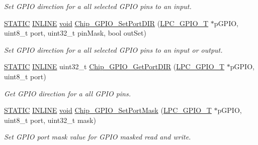 \begin{DoxyCompactItemize}
\begin{DoxyCompactList}\small\item\em Set G\-P\-I\-O direction for a all selected G\-P\-I\-O pins to an input. \end{DoxyCompactList}\item 
\hyperlink{group__LPC__Types__Public__Macros_ga10b2d890d871e1489bb02b7e70d9bdfb}{S\-T\-A\-T\-I\-C} \hyperlink{group__LPC__Types__Public__Types_ga2eb6f9e0395b47b8d5e3eeae4fe0c116}{I\-N\-L\-I\-N\-E} \hyperlink{Paradigm_2Tern__EE_2small_2portmacro_8h_a14d32f8130d3c0b212cfc751730b5b49}{void} \hyperlink{group__GPIO__17XX__40XX_ga6ceffe51a34be90a077b22657b1f90f0}{Chip\-\_\-\-G\-P\-I\-O\-\_\-\-Set\-Port\-D\-I\-R} (\hyperlink{structLPC__GPIO__T}{L\-P\-C\-\_\-\-G\-P\-I\-O\-\_\-\-T} $\ast$p\-G\-P\-I\-O, uint8\-\_\-t port, uint32\-\_\-t pin\-Mask, bool out\-Set)
\begin{DoxyCompactList}\small\item\em Set G\-P\-I\-O direction for a all selected G\-P\-I\-O pins to an input or output. \end{DoxyCompactList}\item 
\hyperlink{group__LPC__Types__Public__Macros_ga10b2d890d871e1489bb02b7e70d9bdfb}{S\-T\-A\-T\-I\-C} \hyperlink{group__LPC__Types__Public__Types_ga2eb6f9e0395b47b8d5e3eeae4fe0c116}{I\-N\-L\-I\-N\-E} uint32\-\_\-t \hyperlink{group__GPIO__17XX__40XX_ga06f22d0dfeb6a06b8280df9bead0fc4b}{Chip\-\_\-\-G\-P\-I\-O\-\_\-\-Get\-Port\-D\-I\-R} (\hyperlink{structLPC__GPIO__T}{L\-P\-C\-\_\-\-G\-P\-I\-O\-\_\-\-T} $\ast$p\-G\-P\-I\-O, uint8\-\_\-t port)
\begin{DoxyCompactList}\small\item\em Get G\-P\-I\-O direction for a all G\-P\-I\-O pins. \end{DoxyCompactList}\item 
\hyperlink{group__LPC__Types__Public__Macros_ga10b2d890d871e1489bb02b7e70d9bdfb}{S\-T\-A\-T\-I\-C} \hyperlink{group__LPC__Types__Public__Types_ga2eb6f9e0395b47b8d5e3eeae4fe0c116}{I\-N\-L\-I\-N\-E} \hyperlink{Paradigm_2Tern__EE_2small_2portmacro_8h_a14d32f8130d3c0b212cfc751730b5b49}{void} \hyperlink{group__GPIO__17XX__40XX_gaee2115e847a281cf3da40209ce6336c8}{Chip\-\_\-\-G\-P\-I\-O\-\_\-\-Set\-Port\-Mask} (\hyperlink{structLPC__GPIO__T}{L\-P\-C\-\_\-\-G\-P\-I\-O\-\_\-\-T} $\ast$p\-G\-P\-I\-O, uint8\-\_\-t port, uint32\-\_\-t mask)
\begin{DoxyCompactList}\small\item\em Set G\-P\-I\-O port mask value for G\-P\-I\-O masked read and write. \end{DoxyCompactList}\item 

\end{DoxyCompactItemize}
